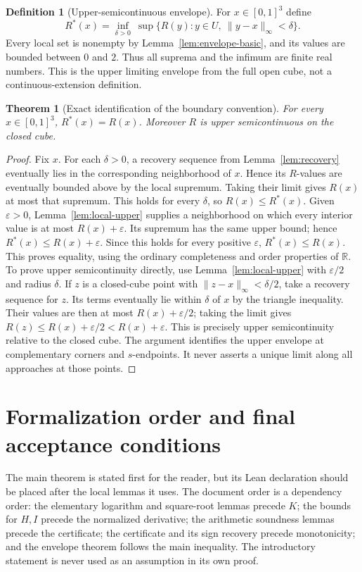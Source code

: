 \documentclass[11pt,a4paper]{article}
\newtheorem{theorem}{Theorem}
\theoremstyle{definition}
\newtheorem{definition}{Definition}[section]
\newcommand{\E}[2]{\refstepcounter{equation}\[#2\tag{\theequation}\label{eq:#1}\]}
\newcommand{\R}{\mathbb R}
\begin{document}
\begin{definition}[Upper-semicontinuous envelope]\label{def:envelope}
For $x\in[0,1]^3$ define
\E{envelope}{R^*(x)=\inf_{\delta>0}\ \sup\{R(y):y\in U,\ \|y-x\|_\infty<\delta\}.}
Every local set is nonempty by Lemma~\ref{lem:envelope-basic}, and its values are bounded between $0$ and $2$. Thus all suprema and the infimum are finite real numbers. This is the upper limiting envelope from the full open cube, not a continuous-extension definition.
\end{definition}

\begin{theorem}[Exact identification of the boundary convention]\label{thm:envelope}
For every $x\in[0,1]^3$, $R^*(x)=R(x)$. Moreover $R$ is upper semicontinuous on the closed cube.
\end{theorem}
\begin{proof}
Fix $x$. For each $\delta>0$, a recovery sequence from Lemma~\ref{lem:recovery} eventually lies in the corresponding neighborhood of $x$. Hence its $R$-values are eventually bounded above by the local supremum. Taking their limit gives $R(x)$ at most that supremum. This holds for every $\delta$, so $R(x)\leq R^*(x)$.
Given $\varepsilon>0$, Lemma~\ref{lem:local-upper} supplies a neighborhood on which every interior value is at most $R(x)+\varepsilon$. Its supremum has the same upper bound; hence $R^*(x)\leq R(x)+\varepsilon$. Since this holds for every positive $\varepsilon$, $R^*(x)\leq R(x)$. This proves equality, using the ordinary completeness and order properties of $\R$.
To prove upper semicontinuity directly, use Lemma~\ref{lem:local-upper} with $\varepsilon/2$ and radius $\delta$. If $z$ is a closed-cube point with $\|z-x\|_\infty<\delta/2$, take a recovery sequence for $z$. Its terms eventually lie within $\delta$ of $x$ by the triangle inequality. Their values are then at most $R(x)+\varepsilon/2$; taking the limit gives $R(z)\leq R(x)+\varepsilon/2<R(x)+\varepsilon$. This is precisely upper semicontinuity relative to the closed cube.
The argument identifies the upper envelope at complementary corners and $s$-endpoints. It never asserts a unique limit along all approaches at those points.
\end{proof}

\section{Formalization order and final acceptance conditions}
The main theorem is stated first for the reader, but its Lean declaration should be placed after the local lemmas it uses. The document order is a dependency order: the elementary logarithm and square-root lemmas precede $K$; the bounds for $H,I$ precede the normalized derivative; the arithmetic soundness lemmas precede the certificate; the certificate and its sign recovery precede monotonicity; and the envelope theorem follows the main inequality. The introductory statement is never used as an assumption in its own proof.
\end{document}
